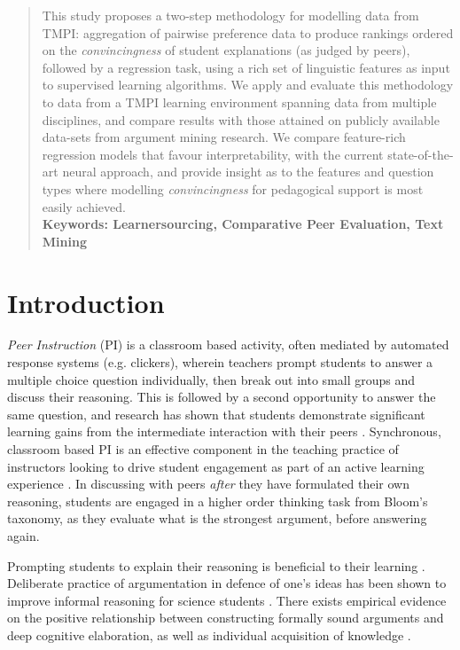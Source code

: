 \documentclass[notitlepage,12pt]{jedm}
\begin{document}
\begin{abstract}
		This study proposes a two-step methodology for modelling data from 
		TMPI: aggregation of pairwise preference data to produce rankings 
		ordered on the \textit{convincingness} of student explanations (as 
		judged by peers), followed by a regression task, using a rich set of 
		linguistic features as input to supervised learning algorithms.
		We apply and evaluate this methodology to data from a TMPI learning 
		environment spanning data from multiple disciplines, and compare 
		results with those attained on publicly available data-sets from 
		argument mining research. 
		We compare feature-rich regression models that favour interpretability, 
		with the current state-of-the-art neural approach, and provide 
		insight as to the features and question types where modelling 
		\textit{convincingness} for pedagogical support is most easily achieved.
		\\ %
		{\parindent0pt
			\textbf{Keywords: Learnersourcing, Comparative Peer Evaluation, 
			Text Mining} 
		}
	\end{abstract}

\section{Introduction}

\textit{Peer Instruction} (PI) is a classroom based activity, often mediated by 
automated response systems (e.g. clickers), wherein teachers prompt students to 
answer a multiple choice question individually, then break out into small 
groups and discuss their reasoning.
This is followed by a second opportunity to answer the same question, and 
research has shown that students demonstrate significant learning gains from 
the intermediate interaction with their peers \cite{crouch_peer_2001}.
Synchronous, classroom based PI is an effective component in the teaching 
practice of instructors looking to drive student engagement as part of an 
active learning experience \cite{charles_beyond_2015}. 
In discussing with peers \textit{after} they have formulated their own 
reasoning, students are engaged in a higher order thinking task from Bloom's 
taxonomy, as they evaluate what is the strongest argument, before answering 
again.

Prompting students to explain their reasoning is beneficial to their learning 
\cite{chi_eliciting_1994}. 
Deliberate practice of argumentation in defence of one's ideas has been shown 
to improve informal reasoning for science students \cite{venville_impact_2010}.
There exists empirical evidence on the positive relationship between 
constructing formally sound arguments and deep cognitive elaboration, as well 
as individual acquisition of knowledge \cite{stegmann_collaborative_2012}.
\end{document}
